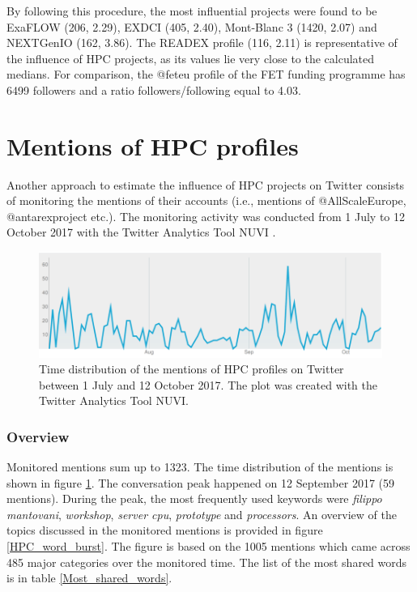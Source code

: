 By following this procedure, the most influential projects were found to be ExaFLOW (206, 2.29), EXDCI (405, 2.40), Mont-Blanc 3 (1420, 2.07) and NEXTGenIO (162, 3.86). The READEX profile (116, 2.11) is representative of the influence of HPC projects, as its values lie very close to the calculated medians. For comparison, the @fet\textunderscore eu profile of the FET funding programme has 6499 followers and a ratio followers/following equal to 4.03.

\section{Mentions of HPC profiles} \label{Mentions_of_HPC_profiles} 
Another approach to estimate the influence of HPC projects on Twitter consists of monitoring the mentions of their accounts (i.e., mentions of @AllScaleEurope, @antarex\textunderscore project etc.). The monitoring activity was conducted from 1 July to 12 October 2017 with the Twitter Analytics Tool NUVI \cite{NUVI}.  

\begin{figure}[!t] 
 \begin{center}
 \includegraphics[scale=0.47]{Images/NUVI_time_distribution.png}
 \caption{Time distribution of the mentions of HPC profiles on Twitter between 1 July and 12 October 2017. The plot was created with the Twitter Analytics Tool NUVI.}
 \label{NUVI_time_distribution}
 \end{center}
\end{figure}

\subsubsection{Overview}
Monitored mentions sum up to 1323. The time distribution of the mentions is shown in figure \ref{NUVI_time_distribution}. The conversation peak happened on 12 September 2017 (59 mentions). During the peak, the most frequently used keywords were \textit{filippo mantovani}, \textit{workshop}, \textit{server cpu}, \textit{prototype} and \textit{processors}. An overview of the topics discussed in the monitored mentions is provided in figure \ref{HPC_word_burst}. The figure is based on the 1005 mentions which came across 485 major categories over the monitored time. The list of the most shared words is in table \ref{Most_shared_words}.

